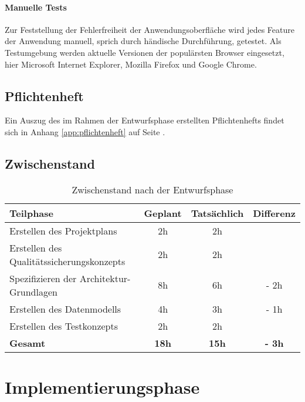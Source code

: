 \documentclass[12pt, xcolor=dvipsnames]{scrartcl}
\begin{document}
\paragraph{Manuelle Tests}
Zur Feststellung der Fehlerfreiheit der Anwendungsoberfläche wird jedes Feature der Anwendung manuell,
sprich durch händische Durchführung, getestet. Als Testumgebung werden aktuelle Versionen der populärsten Browser eingesetzt, hier Microsoft Internet Explorer, Mozilla Firefox und Google Chrome.

\subsection{Pflichtenheft}
Ein Auszug des im Rahmen der Entwurfsphase erstellten Pflichtenhefts findet sich in Anhang \ref{app:pflichtenheft} auf Seite \pageref{app:pflichtenheft}.

\subsection{Zwischenstand}

\begin{table}[H]
	\centering
	\begin{tabular}{lccc}

		\rowcolor{white!15}				
		\textbf{Teilphase} & \textbf{Geplant} & \textbf{Tatsächlich} & \textbf{Differenz} \\\hline		
		

		Erstellen des Projektplans & 2h & 2h & \\	    
	    Erstellen des Qualitätssicherungskonzepts & 2h & 2h & \\	    
	    Spezifizieren der Architektur-Grundlagen & 8h & 6h & - 2h\\	     
	    Erstellen des Datenmodells & 4h & 3h & - 1h \\	      
	    Erstellen des Testkonzepts & 2h & 2h & \\\hline

		\rowcolor{white!15}				
		\textbf{Gesamt} & \textbf{18h} & \textbf{15h} & \textbf{- 3h} \\			

	    
	\end{tabular}
	\caption{Zwischenstand nach der Entwurfsphase}
	\label{tab:zwischenstand_entwurfsphase}
	\end{table}

\section{Implementierungsphase}
\end{document}
